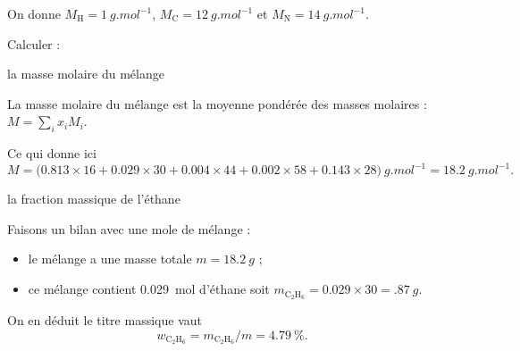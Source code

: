 On donne $M_{\mathrm{H}} = \SI{1}{g.mol^{-1}}$, $M_{\mathrm{C}} = \SI{12}{g.mol^{-1}}$ et $M_{\mathrm{N}} = \SI{14}{g.mol^{-1}}$.

Calculer :
\minusSmallskip

\debutEntrainement

\begin{enonce}
la masse molaire du mélange
\end{enonce}


\begin{corrige}
La masse molaire du mélange est la moyenne pondérée des masses molaires : $M=\sum_i x_iM_i$. 

Ce qui donne ici
\[
M= \big(\num{0.813}\times 16+\num{0.029}\times 30+\num{0.004}\times 44+\num{0.002}\times 58+\num{0.143}\times 28\big)~\si{{g.mol^{-1}}}=
\SI{18.2}{g.mol^{-1}}.
\]
\end{corrige}



\begin{enonce}
la fraction massique de l'éthane
\end{enonce}


\begin{corrige}
Faisons un bilan avec une mole de mélange : 
\begin{itemize}
\item le mélange a une masse totale $m=\SI{18.2}{g}$ ;
\item ce mélange contient \SI{0.029}{mol} d'éthane soit $m_\mathrm{C_2H_6}=\num{0.029}\times 30=\SI{.87}{g}$.
\end{itemize}
On en déduit le titre massique vaut 
\[
w_\mathrm{C_2H_6}=m_\mathrm{C_2H_6}/m=\SI{4.79}{\percent}.
\]
\end{corrige}


\finEntrainement




